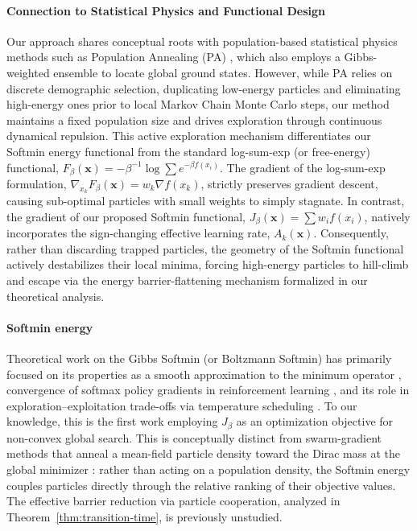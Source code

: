 \documentclass{article}
\theoremstyle{plain}
\theoremstyle{definition}
\theoremstyle{remark}
\newcommand{\prefactor}[2]{A_{#1}(#2)}
\newcommand{\xx}{\mathbf{x}}
\begin{document}
\paragraph{Connection to Statistical Physics and Functional Design}
Our approach shares conceptual roots with population-based statistical physics methods such as Population Annealing (PA) \cite{Wang_2015}, which also employs a Gibbs-weighted ensemble to locate global ground states. However, while PA relies on discrete demographic selection, duplicating low-energy particles and eliminating high-energy ones prior to local Markov Chain Monte Carlo steps, our method maintains a fixed population size and drives exploration through continuous dynamical repulsion. This active exploration mechanism differentiates our Softmin energy functional from the standard log-sum-exp (or free-energy) functional, $F_\beta(\xx) = -{\beta}^{-1} \log \sum e^{-\beta f(x_i)}$. The gradient of the log-sum-exp formulation, $\nabla_{x_k} F_\beta(\xx) = w_k \nabla f(x_k)$, strictly preserves gradient descent, causing sub-optimal particles with small weights to simply stagnate. In contrast, the gradient of our proposed Softmin functional, $J_\beta(\xx) = \sum w_i f(x_i)$, natively incorporates the sign-changing effective learning rate, $\prefactor{k}{\xx}$. Consequently, rather than discarding trapped particles, the geometry of the Softmin functional actively destabilizes their local minima, forcing high-energy particles to hill-climb and escape via the energy barrier-flattening mechanism formalized in our theoretical analysis.

\paragraph{Softmin energy} Theoretical work on the Gibbs Softmin (or Boltzmann Softmin) has primarily focused on its properties as a smooth approximation to the minimum operator \cite{bertsekas1999nonlinear}, convergence of softmax policy gradients in reinforcement learning \cite{mei2020global}, and its role in exploration–exploitation trade-offs via temperature scheduling \cite{song2019revisiting}. To our knowledge, this is the first work employing $J_\beta$ as an optimization objective for non-convex global search. This is conceptually distinct from swarm-gradient methods that anneal a mean-field particle density toward the Dirac mass at the global minimizer \cite{bolte2024swarm}: rather than acting on a population density, the Softmin energy couples particles directly through the relative ranking of their objective values. The effective barrier reduction via particle cooperation, analyzed in Theorem~\ref{thm:transition-time}, is previously unstudied.
\end{document}
